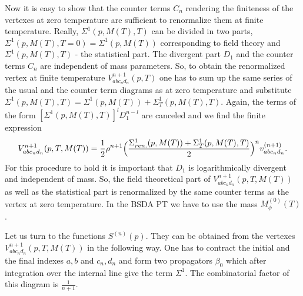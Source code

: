 \documentclass[a4paper,12pt]{article}
\begin{document}
Now it is easy to show that the counter terms $C_n$ rendering the
finiteness of the vertexes at zero temperature are sufficient to
renormalize them at finite temperature.  Really, $\Sigma^1(p, M(T),
T)$ can be divided in two parts, $\Sigma^1(p, M(T), T =0) =
\Sigma^1(p, M(T) ) $ corresponding to field theory and $\Sigma^1 (p,
M(T), T)$ - the statistical part. The divergent part $D_1$ and the
counter terms $C_n$ are independent of mass parameters. So, to obtain
the renormalized vertex at finite temperature $ V^{n+1}_{abc_n d_n}(p,
T)$ one has to sum up the same series of the usual and the counter
term diagrams as at zero temperature and substitute $\Sigma^1(p, M(T),
T) = \Sigma^1(p, M(T)) + \Sigma^1_T(p, M(T), T)$. Again, the terms of
the form $[\Sigma^1(p, M(T), T)]^{l} D_1^{n-l}$ are canceled and we
find the finite expression
\begin{equation} \label{vnt}
V^{n+1}_{abc_n d_n}(p, T, M(T)) = \frac{1}{2}\rho^{n+1} \Bigl(\frac{
  \Sigma^1_{ren.}(p, M(T)) + \Sigma^1_T(p, M(T), T) }{2} \Bigr)^n
  v^{(n+1)}_{abc_n d_n}.
\end{equation}
For this procedure to hold it is important that $D_1$ is
logarithmically divergent and independent of mass. So, the field
theoretical part of  $ V^{n+1}_{abc_n d_n}(p, T, M(T))$ as well as
the statistical part is renormalized by the same counter terms as the
vertex at zero temperature. In the BSDA PT we have to use the mass
$M^{(0)}_{\phi}(T)$.

Let us turn to the functions $S^{(n)}(p)$. They can be obtained from
the vertexes $ V^{n+1}_{abc_n d_n}(p, T, M(T))$ in the following
way. One has to contract the initial and the final indexes $a, b$ and
$c_n, d_n$ and form two propagators $\beta_0$ which after integration
over the internal line give the term $\Sigma^1$. The combinatorial
factor of this diagram is $\frac{1}{n + 1}$.
\end{document}
